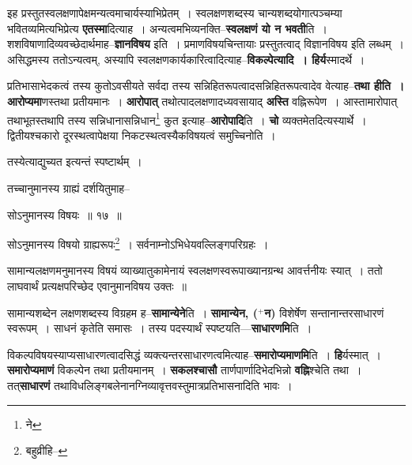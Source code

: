 \documentclass[article,12pt,a4paper]{memoir}
\newcommand{\add}[1]{($^{+}$#1)}
\begin{document}
	  \pstart इह प्रस्तुतस्वलक्षणापेक्षमन्यत्वमाचार्यस्याभिप्रेतम् । स्वलक्षणशब्दस्य चान्यशब्दयोगात्पञ्चम्या भवितव्यमित्यभिप्रेत्य \textbf{एतस्मा}दित्याह । अन्यत्वमभिव्यनक्ति--\textbf{स्वलक्षणं यो न भवती}ति । शशविषाणादिव्यवच्छेदार्थमाह--\textbf{ज्ञानविषय} इति । प्रमाणविषयचिन्तायाः प्रस्तुतत्वाद् विज्ञानविषय इति लब्धम् । असिद्धमस्य ततोऽन्यत्वम्, अस्यापि स्वलक्षणकार्यकारित्वादित्याह--\textbf{विकल्पेत्यादि । हिर्य}स्मादर्थे ।
	\pend
      

	  \pstart प्रतिभासाभेदकत्वं तस्य कुतोऽवसीयते सर्वदा तस्य सन्निहितरूपत्वादसन्निहितरूपत्वादेव वेत्याह--\textbf{तथा हीति । आरोप्यमा}णस्तथा प्रतीयमानः । \textbf{आरोपात्} तथोत्पादलक्षणादध्यवसायाद् \textbf{अस्ति} वह्निरूपेण । आस्तामारोपात् तथाभूतस्तथापि तस्य सन्निधानासन्निधान\footnote{ने} कुत इत्याह--\textbf{आरोपादि}ति । \textbf{चो} व्यक्तमेतदित्यस्यार्थे । द्वितीयश्चकारो दूरस्थत्वापेक्षया निकटस्थत्वस्यैकविषयत्वं समुच्चिनोति ।
	\pend
      

	  \pstart तस्येत्याद्युच्यत इत्यन्तं स्पष्टार्थम् ।
	\pend
	  \bigskip
	  \begingroup
	

	  \pstart तच्चानुमानस्य ग्राह्यं दर्शयितुमाह--
	\pend
       
	  \bigskip
	  \begingroup
	

	  \pstart सोऽनुमानस्य विषयः ॥ १७ ॥
	\pend
      
	  \endgroup
	 

	  \pstart सोऽनुमानस्य विषयो ग्राह्यरूपः\footnote{बहुव्रीहि--\cite{dp-msD-n}} । सर्वनाम्नोऽभिधेयवल्लिङ्गपरिग्रहः ।
	\pend
       

	  \pstart सामान्यलक्षणमनुमानस्य विषयं व्याख्यातुकामेनायं स्वलक्षणस्वरूपाख्यानग्रन्थ आवर्त्तनीयः स्यात् । ततो लाघवार्थं प्रत्यक्षपरिच्छेद एवानुमानविषय उक्तः ॥
	\pend
      
	  \endgroup
	

	  \pstart सामान्यशब्देन लक्षणशब्दस्य विग्रहम ह--\textbf{सामान्येने}ति । \textbf{सामान्येन, \add{न}} विशेर्षेण सन्तानान्तरसाधारणं स्वरूपम् । साधनं कृतेति समासः । तस्य पदस्यार्थं स्पष्टयति—\textbf{साधारणमि}ति ।
	\pend
      

	  \pstart विकल्पविषयस्याप्यसाधारणत्वादसिद्धं व्यक्त्यन्तरसाधारणत्वमित्याह--\textbf{समारोप्यमाणमि}ति । \textbf{हि}र्यस्मात् । \textbf{समारोप्यमाणं} विकल्पेन तथा प्रतीयमानम् । \textbf{सकलश्चासौ} तार्णपार्णादिभेदभिन्नो \textbf{वह्नि}श्चेति तथा । तत्\textbf{साधारणं} तथाविधलिङ्गबलेनानग्निव्यावृत्तवस्तुमात्रप्रतिभासनादिति भावः ।
	\pend
      
\end{document}
